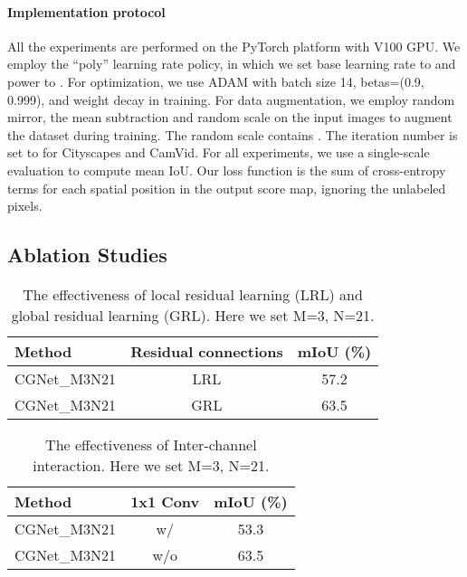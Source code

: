 \documentclass[10pt,twocolumn,letterpaper]{article}
\begin{document}
\paragraph{Implementation protocol}
 All the experiments are performed on the PyTorch platform with  V100 GPU. We employ the ``poly'' learning rate policy, in which we set base learning rate to  and power to .  For optimization, we use ADAM \cite{kingma2015} with batch size 14, betas=(0.9, 0.999), and weight decay  in training. For data augmentation, we employ random mirror, the mean subtraction and random scale on the input images to augment the dataset during training. The random scale contains . The iteration number is set to  for Cityscapes and CamVid.
For all experiments, we use a single-scale evaluation to compute mean IoU. Our loss function is the sum of cross-entropy terms for each spatial position in the output score map, ignoring the unlabeled pixels.

\subsection{Ablation Studies}


\begin{table}[t]
\begin{center}
\begin{tabular}{|lcc|}
\hline
Method & Residual connections & {mIoU (\%)} \\
\hline\hline
CGNet\_M3N21 & LRL &  57.2  \\
CGNet\_M3N21 & GRL & 63.5   \\
\hline
\end{tabular}
\end{center}
\caption{The effectiveness of local residual learning (LRL) and global residual learning (GRL). Here we set M=3, N=21. }
\label{table:tab7}
\end{table}



\begin{table}[t]
\begin{center}
\begin{tabular}{|lcc|}
\hline
Method &   1x1 Conv & {mIoU (\%)} \\
\hline\hline
CGNet\_M3N21 &   w/  &  53.3 \\
CGNet\_M3N21 & w/o   &  63.5   \\
\hline
\end{tabular}
\end{center}
\caption{The effectiveness of Inter-channel interaction. Here we set M=3, N=21. }
\label{table:tab8}
\vspace{-5pt}
\end{table}
\end{document}
